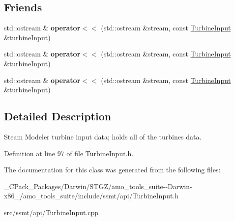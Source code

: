 \subsection*{Friends}
\begin{DoxyCompactItemize}
\item 
\mbox{\label{class_turbine_input_ab6b5d28aa9c5e7f33aa7a3c63bf58c51}} 
std\+::ostream \& {\bfseries operator$<$$<$} (std\+::ostream \&stream, const \hyperlink{class_turbine_input}{Turbine\+Input} \&turbine\+Input)
\item 
\mbox{\label{class_turbine_input_ab6b5d28aa9c5e7f33aa7a3c63bf58c51}} 
std\+::ostream \& {\bfseries operator$<$$<$} (std\+::ostream \&stream, const \hyperlink{class_turbine_input}{Turbine\+Input} \&turbine\+Input)
\item 
\mbox{\label{class_turbine_input_ab6b5d28aa9c5e7f33aa7a3c63bf58c51}} 
std\+::ostream \& {\bfseries operator$<$$<$} (std\+::ostream \&stream, const \hyperlink{class_turbine_input}{Turbine\+Input} \&turbine\+Input)
\end{DoxyCompactItemize}


\subsection{Detailed Description}
Steam Modeler turbine input data; holds all of the turbines\textquotesingle{} data. 

Definition at line 97 of file Turbine\+Input.\+h.



The documentation for this class was generated from the following files\+:\begin{DoxyCompactItemize}
\item 
\+\_\+\+C\+Pack\+\_\+\+Packages/\+Darwin/\+S\+T\+G\+Z/amo\+\_\+tools\+\_\+suite-\/-\/\+Darwin-\/x86\+\_/amo\+\_\+tools\+\_\+suite/include/ssmt/api/Turbine\+Input.\+h\item 
src/ssmt/api/Turbine\+Input.\+cpp\end{DoxyCompactItemize}
